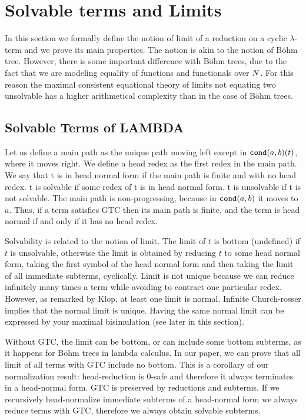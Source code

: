 \newcommand\Lim[1]{{\tt Lim}(#1)}
\newcommand{\NFZ}{{\tt NF}_0}

\section{Solvable terms and Limits}

In this section we formally define the notion of limit of a reduction on a cyclic 
$\lambda$-term and we prove its main properties. The notion is akin to the notion
of B\"{o}hm tree. However, there is some important difference with B\"{o}hm trees,
due to the fact that we are modeling equality of functions and functionals over ${N}$. 
For this reason the maximal consistent equational theory of limits not equating two 
unsolvable has a higher arithmetical complexity than in the case of B\"{o}hm trees.


\subsection{Solvable Terms of LAMBDA}
      Let us define a main path as the unique path moving left except in ${\tt cond}(a,b)(t)$, where it 
moves right. We define a head redex as the first redex in the main path. We say that t is in head 
normal form if the main path is finite and with no head redex. t is solvable if some redex of t is in 
head normal form. t is unsolvable if t is not solvable. The main path is non-progressing,
because in ${\tt cond}(a,b)$ it moves to $a$. Thus, if a term satisfies GTC then its main path is finite,
and the term is head normal if and only if it has no head redex.
 
      Solvability is related to the notion of limit. The limit of $t$ is bottom (undefined) if $t$ is unsolvable, otherwise the limit is obtained by reducing $t$ to some head normal form, taking the first symbol of the head normal form and then taking the limit of all immediate subterms, cyclically. Limit is not unique because we can reduce infinitely many times a term while avoiding to contract one particular redex. However, as remarked by Klop, at least one limit is normal. Infinite Church-rosser implies that the normal limit is unique. 
      Having the same normal limit can be expressed by your maximal bisimulation (see later
      in this section).
 
      Without GTC, the limit can be bottom, or can include some bottom subterms, as it happens for B\"{o}hm trees in lambda calculus.  In our paper, we can prove that all limit of all terms with GTC include no bottom. This is a corollary of our normalization result: head-reduction is 0-safe and therefore it always terminates in a head-normal form. GTC is preserved by reductions and subterms. If we recursively head-normalize immediate subterms of a head-normal form we always reduce terms with GTC, therefore we always obtain solvable subterms.
 
